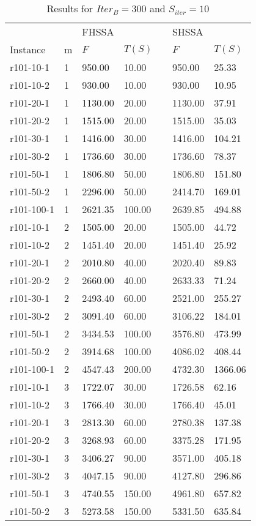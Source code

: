 \documentclass[final,5p,times,twocolumn]{elsarticle}
\begin{document}
{{{{{{{{{{{\renewcommand{\arraystretch}{1.2}
\begin{table}[htbp]
\centering
\caption{Results for $Iter_{B}=300$ and $S_{iter}=10$}
\centering
\begin{tabular}{l l l l l l l}
\hline 
&&\multicolumn{2}{l}{FHSSA}&& \multicolumn{2}{l}{SHSSA}\\
\cline{3-4}\cline{6-7}
Instance & m & $F$ & $T(S)$ && $F$ & $T(S)$\\
\hline
r101-10-1&1&950.00&10.00&&950.00&25.33\\
r101-10-2&1&930.00&10.00&&930.00&10.95\\
r101-20-1&1&1130.00&20.00&&1130.00&37.91\\
r101-20-2&1&1515.00&20.00&&1515.00&35.03\\
r101-30-1&1&1416.00&30.00&&1416.00&104.21\\
r101-30-2&1&1736.60&30.00&&1736.60&78.37\\
r101-50-1&1&1806.80&50.00&&1806.80&151.80\\
r101-50-2&1&2296.00&50.00&&2414.70&169.01\\
r101-100-1&1&2621.35&100.00&&2639.85&494.88\\
r101-10-1&2&1505.00&20.00&&1505.00&44.72\\
r101-10-2&2&1451.40&20.00&&1451.40&25.92\\
r101-20-1&2&2010.80&40.00&&2020.40&89.83\\
r101-20-2&2&2660.00&40.00&&2633.33&71.24\\
r101-30-1&2&2493.40&60.00&&2521.00&255.27\\
r101-30-2&2&3091.40&60.00&&3106.22&184.01\\
r101-50-1&2&3434.53&100.00&&3576.80&473.99\\
r101-50-2&2&3914.68&100.00&&4086.02&408.44\\
r101-100-1&2&4547.43&200.00&&4732.30&1366.06\\
r101-10-1&3&1722.07&30.00&&1726.58&62.16\\
r101-10-2&3&1766.40&30.00&&1766.40&45.01\\
r101-20-1&3&2813.30&60.00&&2780.38&137.38\\
r101-20-2&3&3268.93&60.00&&3375.28&171.95\\
r101-30-1&3&3406.27&90.00&&3571.00&405.18\\
r101-30-2&3&4047.15&90.00&&4127.80&296.86\\
r101-50-1&3&4740.55&150.00&&4961.80&657.82\\
r101-50-2&3&5273.58&150.00&&5331.50&635.84\\

\end{tabular}
\end{table}}}}}}}}}}}}
\end{document}

